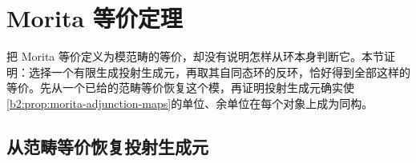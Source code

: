 
\section{Morita 等价定理}
\label{b2:sec:1603}

把 Morita 等价定义为模范畴的等价，却没有说明怎样从环本身判断它。本节证明：选择一个有限生成投射生成元，再取其自同态环的反环，恰好得到全部这样的等价。先从一个已给的范畴等价恢复这个模，再证明投射生成元确实使\cref{b2:prop:morita-adjunction-maps}的单位、余单位在每个对象上成为同构。

%
%

\subsection{从范畴等价恢复投射生成元}
\label{b2:subsec:1603:01}

